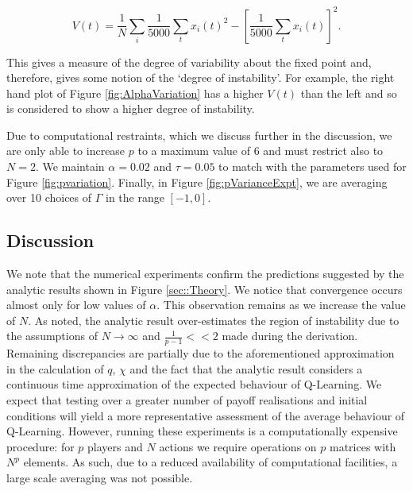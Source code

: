 \documentclass[sigconf,anonymous]{aamas}
\begin{document}
\begin{equation*}
    V(t) = \frac{1}{N} \sum_i \frac{1}{5000} \sum_t x_i(t)^2 - \left[\frac{1}{5000} \sum_t x_i(t) \right]^2 .
\end{equation*}

This gives a measure of the degree of variability about the fixed point and, therefore, gives some notion of the `degree of instability'. For example, the right hand plot of Figure \ref{fig:AlphaVariation} has a higher $V(t)$ than the left and so is considered to show a higher degree of instability. 

Due to computational restraints, which we discuss further in the discussion, we are only able to increase $p$ to a maximum value of 6 and must restrict also to $N = 2$. We maintain $\alpha = 0.02$ and $\tau = 0.05$ to match with the parameters used for Figure \ref{fig:pvariation}. Finally, in Figure \ref{fig:pVarianceExpt}, we are averaging over 10 choices of $\Gamma$ in the range $[-1, 0]$. 

\subsection{Discussion}
    
We note that the numerical experiments confirm the predictions suggested by the analytic results shown in Figure \ref{sec::Theory}. We notice that convergence occurs almost only for low values of $\alpha$. This observation remains as we increase the value of $N$. As noted, the analytic result over-estimates the region of instability due to the assumptions of $N \rightarrow \infty$ and $\frac{1}{p-1} << 2$ made during the derivation. Remaining discrepancies are partially due to the aforementioned approximation in the calculation of $q$, $\chi$ and the fact that the analytic result considers a continuous time approximation of the expected behaviour of Q-Learning. We expect that testing over a greater number of payoff realisations and initial conditions will yield a more representative assessment of the average behaviour of Q-Learning. However, running these experiments is a computationally expensive procedure: for $p$ players and $N$ actions we require operations on $p$ matrices with $N^{p}$ elements. As such, due to a reduced availability of computational facilities, a large scale averaging was not possible.
\end{document}
